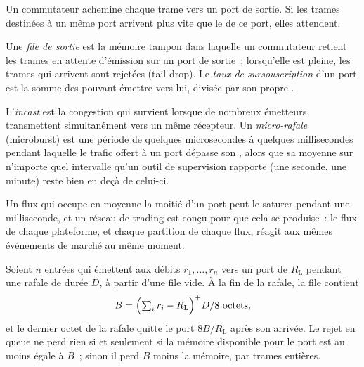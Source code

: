Un commutateur achemine chaque trame vers un port de sortie. Si les trames destinées à un même port arrivent plus vite que le  de ce port,
elles attendent.

\begin{definition}\label{def:nw:networking-for-trading:egress}
Une \emph{file de sortie} est la mémoire tampon dans laquelle un commutateur retient les trames en attente d'émission sur un port de sortie~;
lorsqu'elle est pleine, les trames qui arrivent sont rejetées (tail drop). Le \emph{taux de sursouscription} d'un port est la somme des  pouvant émettre vers lui,
divisée par son propre .
\end{definition}

\begin{definition}\label{def:nw:networking-for-trading:burst}
L'\emph{incast} est la congestion qui survient lorsque de nombreux émetteurs transmettent simultanément vers un même récepteur. Un
\emph{micro-rafale} (microburst) est une période de quelques microsecondes à quelques millisecondes pendant laquelle le trafic offert à un port
dépasse son , alors que sa moyenne sur n'importe quel intervalle qu'un outil de supervision rapporte (une seconde, une minute) reste bien en deçà
de celui-ci.
\end{definition}

Un flux qui occupe en moyenne la moitié d'un port peut le saturer pendant une milliseconde, et un réseau de trading est conçu pour que cela
se produise~: le flux de chaque plateforme, et chaque partition de chaque flux, réagit aux mêmes événements de marché au même moment.

\begin{proposition}\label{prop:nw:networking-for-trading:fluid}
Soient $n$ entrées qui émettent aux débits $r_1, \dots, r_n$ vers un port de  $R_{\mathrm L}$ pendant une rafale de durée $D$, à partir
d'une file vide. À la fin de la rafale, la file contient
\[
  B = \Bigl(\textstyle\sum_i r_i - R_{\mathrm L}\Bigr)^{+} D / 8 \text{ octets},
\]
et le dernier octet de la rafale quitte le port $8B/R_{\mathrm L}$ après son arrivée. Le rejet en queue ne perd rien si et seulement si la mémoire
disponible pour le port est au moins égale à $B$~; sinon il perd $B$ moins la mémoire, par trames entières.
\end{proposition}

